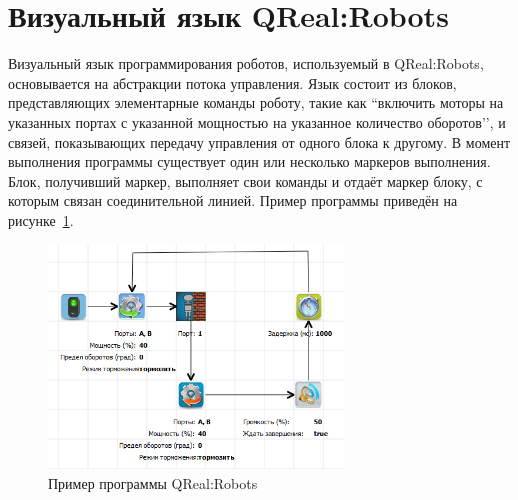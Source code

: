\documentclass[a4paper]{article}
\begin{document}
\section{Визуальный язык QReal:Robots}
Визуальный язык программирования роботов, используемый в QReal:Robots, основывается на абстракции потока управления. Язык состоит из блоков, представляющих элементарные команды роботу, такие как ``включить моторы на указанных портах с указанной мощностью на указанное количество оборотов’’, и связей, показывающих передачу управления от одного блока к другому. В момент выполнения программы существует один или несколько маркеров выполнения. Блок, получивший маркер, выполняет свои команды и отдаёт маркер блоку, с которым связан соединительной линией. Пример программы приведён на рисунке~\ref{programExample}.

\begin{figure} [ht]
  \begin{center}
    \includegraphics[width=0.7\textwidth]{programExample.png}
    \caption{Пример программы QReal:Robots}
    \label{programExample}
  \end{center}
\end{figure}
\end{document}
